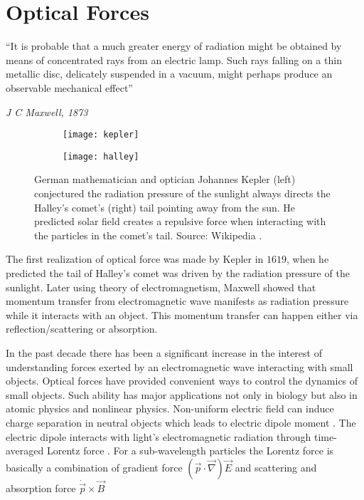 \section{Optical Forces}

\setlength{\epigraphwidth}{0.8\textwidth}
\epigraph{``It is probable that a much greater energy of radiation might be obtained by means of concentrated rays from an electric lamp. Such rays falling on a thin metallic disc, delicately suspended in a vacuum, might perhaps produce an observable mechanical effect''}{\textit{J C Maxwell, 1873}}

\begin{figure}
\begin{subfigure}{.4\textwidth}
  \centering
  \texttt{[image: kepler]}
  \label{fig:kepler}
\end{subfigure}%
\begin{subfigure}{.4\textwidth}
  \centering
  \texttt{[image: halley]}
  \label{fig:halley}
\end{subfigure}
\caption{German mathematician and optician Johannes Kepler (left) conjectured the radiation pressure of the sunlight always directs the Halley's comet's (right) tail pointing away from the sun. He predicted solar field creates a repulsive force when interacting with the particles in the comet's tail. Source: Wikipedia \cite{kepler_pic, halley_comet}.}
\label{fig:kepler_halley}
\end{figure}

The first realization of optical force was made by Kepler in $1619$, when he predicted the tail of Halley's comet was driven by the radiation pressure of the sunlight. Later using theory of electromagnetism, Maxwell showed that momentum transfer from electromagnetic wave manifests as radiation pressure while it interacts with an object. This momentum transfer can happen either via reflection/scattering or absorption. 

In the past decade there has been a significant increase in the interest of understanding forces exerted by an electromagnetic wave interacting with small objects. Optical forces have provided convenient ways to control the dynamics of small objects. Such ability has major applications not only in biology but also in atomic physics and nonlinear physics. Non-uniform electric field can induce charge separation in neutral objects which leads to electric dipole moment \cite{jackson_classical_1999}. The electric dipole interacts with light's electromagnetic radiation through time-averaged Lorentz force \cite{Chaumet:00, gordon1973, Dungey:91}. For a sub-wavelength particles the Lorentz force is basically a combination of gradient force $(\vec{p}\cdot \vec{\nabla})\vec{E}$ and scattering and absorption force $\dot{\vec{p}}\times \vec{B}$ \cite{gordon1973}

